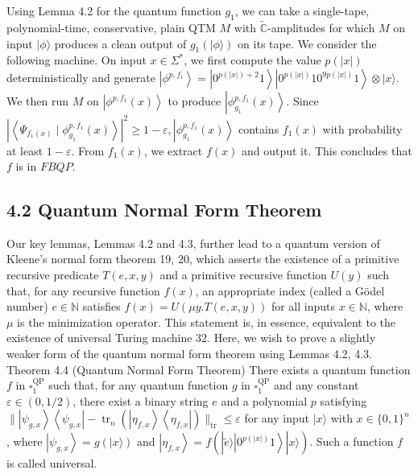 \documentclass[10pt]{article}
\begin{document}
Using Lemma 4.2 for the quantum function $g_{1}$, we can take a single-tape, polynomial-time, conservative, plain QTM $M$ with $\tilde{\mathbb{C}}$-amplitudes for which $M$ on input $|\phi\rangle$ produces a clean output of $g_{1}(|\phi\rangle)$ on its tape. We consider the following machine. On input $x \in \Sigma^{*}$, we first compute the value $p(|x|)$ deterministically and generate $\left|\phi^{p, f_{1}}\right\rangle=\left|0^{p(|x|)+2} 1\right\rangle\left|0^{p(|x|)} 10^{9 p(|x|)} 1\right\rangle \otimes|x\rangle$. We then run $M$ on $\left|\phi^{p, f_{1}}(x)\right\rangle$ to produce $\left|\phi_{g_{1}}^{p, f_{1}}(x)\right\rangle$. Since $\left|\left\langle\Psi_{f_{1}(x)} \mid \phi_{g_{1}}^{p, f_{1}}(x)\right\rangle\right|^{2} \geq 1-\varepsilon,\left|\phi_{g_{1}}^{p, f_{1}}(x)\right\rangle$ contains $f_{1}(x)$ with probability at least $1-\varepsilon$. From $f_{1}(x)$, we extract $f(x)$ and output it. This concludes that $f$ is in $F B Q P$.

\subsection*{4.2 Quantum Normal Form Theorem}
Our key lemmas, Lemmas 4.2 and 4.3, further lead to a quantum version of Kleene's normal form theorem 19, 20, which asserts the existence of a primitive recursive predicate $T(e, x, y)$ and a primitive recursive function $U(y)$ such that, for any recursive function $f(x)$, an appropriate index (called a Gödel number) $e \in \mathbb{N}$ satisfies $f(x)=U(\mu y . T(e, x, y))$ for all inputs $x \in \mathbb{N}$, where $\mu$ is the minimization operator. This statement is, in essence, equivalent to the existence of universal Turing machine 32. Here, we wish to prove a slightly weaker form of the quantum normal form theorem using Lemmas 4.2, 4.3.\\
Theorem 4.4 (Quantum Normal Form Theorem) There exists a quantum function $f$ in $\square_{1}^{\mathrm{QP}}$ such that, for any quantum function $g$ in $\square_{1}^{\mathrm{QP}}$ and any constant $\varepsilon \in(0,1 / 2)$, there exist a binary string $e$ and a polynomial $p$ satisfying $\|\left|\psi_{g, x}\right\rangle\left\langle\psi_{g, x}\right|-\operatorname{tr}_{n}\left(\left|\eta_{f, x}\right\rangle\left\langle\eta_{f, x}\right|\right) \|_{\mathrm{tr}} \leq \varepsilon$ for any input $|x\rangle$ with $x \in\{0,1\}^{n}$, where $\left|\psi_{g, x}\right\rangle=g(|x\rangle)$ and $\left|\eta_{f, x}\right\rangle=f\left(|\tilde{e}\rangle\left|0^{p(|x|)} 1\right\rangle|x\rangle\right)$. Such a function $f$ is called universal.
\end{document}
